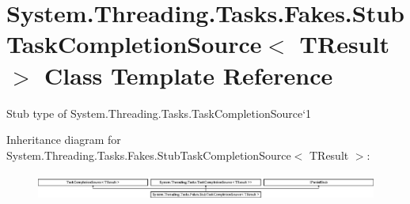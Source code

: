 \hypertarget{class_system_1_1_threading_1_1_tasks_1_1_fakes_1_1_stub_task_completion_source_3_01_t_result_01_4}{\section{System.\-Threading.\-Tasks.\-Fakes.\-Stub\-Task\-Completion\-Source$<$ T\-Result $>$ Class Template Reference}
\label{class_system_1_1_threading_1_1_tasks_1_1_fakes_1_1_stub_task_completion_source_3_01_t_result_01_4}
}


Stub type of System.\-Threading.\-Tasks.\-Task\-Completion\-Source`1 


Inheritance diagram for System.\-Threading.\-Tasks.\-Fakes.\-Stub\-Task\-Completion\-Source$<$ T\-Result $>$\-:\begin{figure}[H]
\begin{center}
\leavevmode
\includegraphics[height=0.893142cm]{class_system_1_1_threading_1_1_tasks_1_1_fakes_1_1_stub_task_completion_source_3_01_t_result_01_4}
\end{center}
\end{figure}
